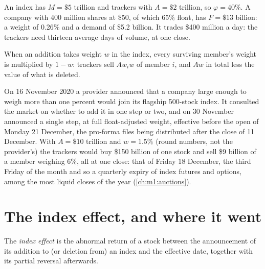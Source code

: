 \begin{example}\label{ex:m1:index-construction-and-rebalancing:thirteen}
An index has $M = \$5$ trillion and trackers with $A = \$2$ trillion, so
$\varphi = 40\%$. A company with 400 million shares at \$50, of which 65\%
float, has $F = \$13$ billion: a weight of 0.26\% and a demand of \$5.2
billion. It trades \$400 million a day: the trackers need thirteen average
days of volume, at one close.
\end{example}

\begin{proposition}\label{prop:m1:index-construction-and-rebalancing:funding}
When an addition takes weight $w$ in the index, every surviving member's
weight is multiplied by $1-w$: trackers sell $Aw_iw$ of member $i$, and $Aw$
in total less the value of what is deleted.
\end{proposition}

\begin{example}\label{ex:m1:index-construction-and-rebalancing:large}
On 16 November 2020 a provider announced that a company large enough to
weigh more than one percent would join its flagship 500-stock index. It
consulted the market on whether to add it in one step or two, and on 30
November announced a single step, at full float-adjusted weight, effective
before the open of Monday 21 December, the pro-forma files being distributed
after the close of 11 December. With $A = \$10$ trillion and $w = 1.5\%$
(round numbers, not the provider's) the trackers would buy \$150 billion of
one stock and sell \$9 billion of a member weighing 6\%, all at one close:
that of Friday 18 December, the third Friday of the month and so a quarterly
expiry of index futures and options, among the most liquid closes of the
year (\cref{ch:m1:auctions}).
\end{example}

\section{The index effect, and where it went}

\begin{definition}\label{def:m1:index-construction-and-rebalancing:effect}
The \emph{index effect} is the abnormal return of a
stock between the announcement of its addition to (or deletion from) an index
and the effective date, together with its partial reversal afterwards.
\end{definition}

